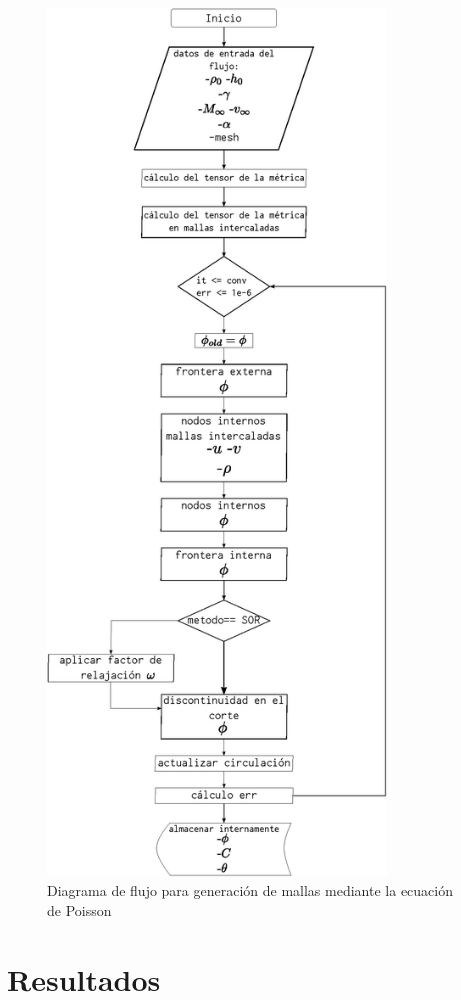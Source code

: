 \documentclass[letterpaper, openright, 12pt]{book}
\begin{document}
    \begin{figure}[htbp!]
        \centering
        \includegraphics[keepaspectratio, width=90mm]{./img/flujo_potencial_funcion}
        \caption{Diagrama de flujo para generación de mallas mediante la
            ecuación de Poisson}
        \label{flujo_potencial_funcion}
    \end{figure}
%
%
%
%
%

%
%
%
%
%
\chapter{Resultados}
\end{document}
